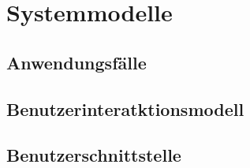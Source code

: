 \chapter{Systemmodelle}


\section{Anwendungsfälle}

	\begin{figure}[htbp]
	  \centering
	  
	\end{figure}


\section{Benutzerinteratktionsmodell}

	\begin{figure}[htbp]
	  \centering
	  
	\end{figure}


\section{Benutzerschnittstelle}

	\begin{figure}[htbp]
	  \centering
	  
	\end{figure}

	\begin{figure}[htbp]
	  \centering
	  
	\end{figure}